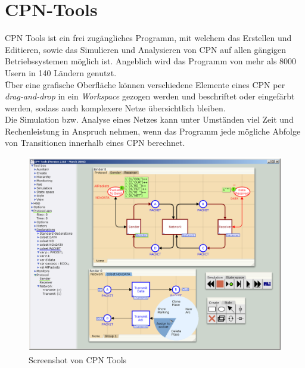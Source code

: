 \documentclass[11pt,onecolumn,a4paper,DIV=calc]{scrartcl}
\begin{document}
\section{CPN-Tools}
CPN Tools ist ein frei zugängliches Programm, mit welchem das Erstellen und Editieren, sowie das Simulieren und Analysieren von CPN auf allen gängigen Betriebssystemen möglich ist. Angeblich wird das Programm von mehr als 8000 Usern in 140 Ländern genutzt.\\
Über eine grafische Oberfläche können verschiedene Elemente eines CPN per \textit{drag-and-drop} in ein \textit{Workspace} gezogen werden und beschriftet oder eingefärbt werden, sodass auch komplexere Netze übersichtlich bleiben. \\
Die Simulation bzw. Analyse eines Netzes kann unter Umständen viel Zeit und Rechenleistung in Anspruch nehmen, wenn das Programm jede mögliche Abfolge von Transitionen innerhalb eines CPN berechnet.

\begin{figure}
    \centering
    \includegraphics[scale=0.5]{tool.PNG}
    \caption{Screenshot von CPN Tools}
    \label{fig:tool}
\end{figure}
\end{document}

